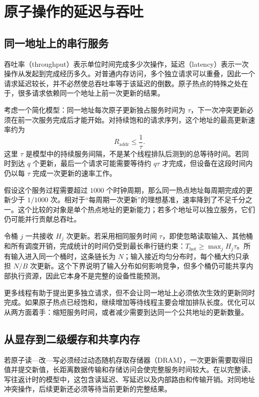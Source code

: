 \section{原子操作的延迟与吞吐}
\label{l13:sec:throughput}

\subsection{同一地址上的串行服务}

吞吐率（throughput）表示单位时间完成多少次操作，延迟（latency）表示一次操作从发起到完成经历多久。对普通内存访问，多个独立请求可以重叠，因此一个请求延迟较长，并不必然使总吞吐率等于该延迟的倒数。原子热点的特殊之处在于，很多请求依赖同一个地址上前一次更新的结果。

考虑一个简化模型：同一地址每次原子更新独占服务时间为 $\tau$，下一次冲突更新必须在前一次服务完成后才能开始。对持续饱和的请求序列，这个地址的最高更新速率约为
\begin{equation}
R_{\mathrm{addr}}\le\frac{1}{\tau}.
\label{l13:eq:atomic-rate}
\end{equation}
这里 $\tau$ 是模型中的持续服务间隔，不是某个线程排队后测到的总等待时间。若同时到达 $q$ 个更新，最后一个请求可能需要等待约 $q\tau$ 才完成，但设备在这段时间内仍以每 $\tau$ 完成一次更新的速率工作。

假设这个服务过程需要超过 $1000$ 个时钟周期，那么同一热点地址每周期完成的更新少于 $1/1000$ 次。相对于“每周期一次更新”的理想基准，速率降到了不足千分之一。这个比较的对象是单个热点地址的更新能力；若多个地址可以独立服务，它们仍可能并行贡献总吞吐。

令桶 $j$ 一共接收 $H_j$ 次更新。若采用相同服务时间 $\tau$，即使忽略读取输入、其他桶和所有调度开销，完成统计的时间仍受到最长串行链约束：$T_{\mathrm{hot}}\ge\max_j H_j\tau$。所有输入进入同一个桶时，这条链长为 $N$；输入接近均匀分布时，每个桶大约只承担 $N/B$ 次更新。这个下界说明了输入分布如何影响竞争，但多个桶仍可能共享内部执行资源，因此它本身不是完整的设备性能预测。

更多线程有助于提出更多独立请求，但不会让同一地址上必须依次生效的更新同时完成。如果原子热点已经饱和，继续增加等待线程主要会增加排队长度。优化可以从两方面着手：缩短服务时间，或者减少需要到达同一个公共地址的更新数量。

\subsection{从显存到二级缓存和共享内存}

若原子读—改—写必须经过动态随机存取存储器（DRAM），一次更新需要取得旧值并提交新值，长距离数据传输和存储访问会使完整服务时间较大。在以完整读、写往返计时的模型中，这包含读延迟、写延迟以及内部路由和传输开销。对同地址冲突操作，后续更新还必须等待当前更新的完整结果。

